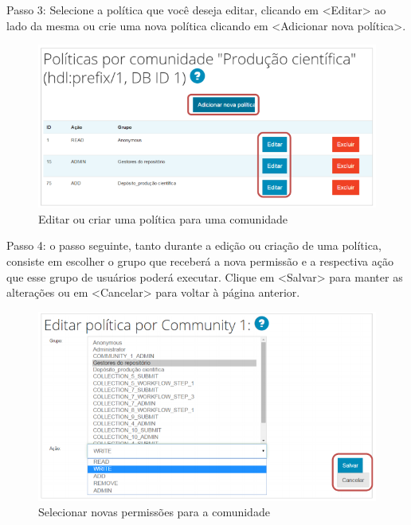 \documentclass[12pt,hidelinks]{article}
\begin{document}
    Passo 3: Selecione a política que você deseja editar, clicando em <Editar> ao lado da mesma ou crie uma nova política clicando em <Adicionar nova política>. 
    
    \begin{figure}[!htp]
                \centering
                \includegraphics[scale=0.8]{figura/Figura75.png}
                \caption{Editar ou criar uma política para uma comunidade}
            \label{Rotulo}
        \end{figure}

\newpage
    
    Passo 4: o passo seguinte, tanto durante a edição ou criação de uma política, consiste em escolher o grupo que receberá a nova permissão e a respectiva ação que esse grupo de usuários poderá executar. Clique em <Salvar> para manter as alterações ou em <Cancelar> para voltar à página anterior.
    
    \begin{figure}[!htp]
                \centering
                \includegraphics[scale=0.8]{figura/Figura76.png}
                \caption{Selecionar novas permissões para a comunidade}
            \label{Rotulo}
        \end{figure}
    
\end{document}
